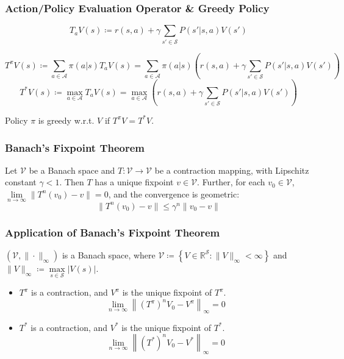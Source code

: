\documentclass[UTF8,11pt,colorlinks,compress,openany]{beamer}%
\begin{document}
\begin{frame}\frametitle{Action/Policy Evaluation Operator \& Greedy Policy}
	\begin{definition}
		\[T_aV(s)\coloneqq r(s,a)+\gamma\sum\limits_{s'\in\mathcal{S}}P(s'|s,a)V(s')\]
	\end{definition}
\setlength\abovedisplayskip{0pt}
\setlength\belowdisplayskip{0pt}
	\begin{definition}
		\[T^\pi V(s)\coloneqq \sum\limits_{a\in\mathcal{A}}\pi(a|s)T_aV(s)=\sum\limits_{a\in\mathcal{A}}\pi(a|s)\left(r(s,a)+\gamma\sum\limits_{s'\in\mathcal{S}}P(s'|s,a)V(s')\right)\]
		\[T^* V(s)\coloneqq \max\limits_{a\in\mathcal{A}}T_aV(s)=\max\limits_{a\in\mathcal{A}}\left(r(s,a)+\gamma\sum\limits_{s'\in\mathcal{S}}P(s'|s,a)V(s')\right)\]
	\end{definition}
	\begin{definition}
		Policy $\pi$ is greedy w.r.t. $V$ if $T^\pi V=T^* V$.
	\end{definition}	
\end{frame}

\begin{frame}\frametitle{Banach's Fixpoint Theorem}
	\begin{theorem}
		Let $\mathcal{V}$ be a Banach space and $T:\mathcal{V}\to\mathcal{V}$ be a contraction mapping, with Lipschitz constant $\gamma<1$. Then $T$ has a unique fixpoint $v\in\mathcal{V}$. Further, for each $v_0\in\mathcal{V}$, $\lim\limits_{n\to\infty}\|T^n(v_0)-v\|=0$, and the convergence is geometric:
		\[\|T^n(v_0)-v\|\leq\gamma^n\|v_0-v\|\]
	\end{theorem}
\end{frame}

\begin{frame}\frametitle{Application of Banach's Fixpoint Theorem}
	\begin{theorem}
		$(\mathcal{V},\|\cdot\|_\infty)$ is a Banach space, where
		$\mathcal{V}\coloneqq \left\{V\in\mathbb{R}^{\mathcal{S}}: \|V\|_\infty<\infty\right\}$ and $\|V\|_\infty\coloneqq \max\limits_{s\in\mathcal{S}}|V(s)|$.
	\end{theorem}
	\begin{block}{}
		\begin{itemize}
			\item $T^\pi$ is a contraction, and $V^\pi$ is the unique fixpoint of $T^\pi$.
			\[\lim\limits_{n\to\infty}\left\|(T^\pi)^nV_0-V^\pi\right\|_\infty=0\]
			\item $T^*$ is a contraction, and $V^*$ is the unique fixpoint of $T^*$.
			\[\lim\limits_{n\to\infty}\left\|(T^*)^nV_0-V^*\right\|_\infty=0\]
		\end{itemize}
	\end{block}
\end{frame}
\end{document}

